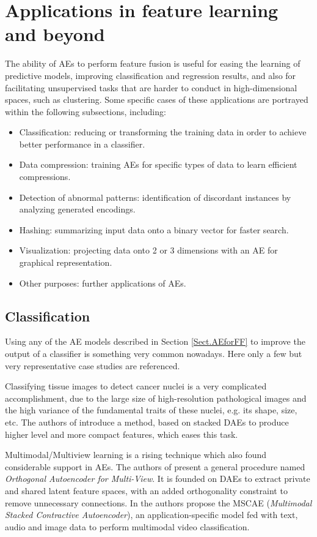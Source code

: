 \documentclass[preprint,5p,compress]{elsarticle}
\begin{document}
\section{Applications in feature learning and beyond}\label{Sec.Applications}

The ability of AEs to perform feature fusion is useful for easing the learning of predictive models, improving classification and regression results, and also for facilitating unsupervised tasks that are harder to conduct in high-dimensional spaces, such as clustering. Some specific cases of these applications are portrayed within the following subsections, including:
\begin{itemize}
  \setlength\itemsep{-.2em}
\item Classification: reducing or transforming the training data in order to achieve better performance in a classifier.
\item Data compression: training AEs for specific types of data to learn efficient compressions.
\item Detection of abnormal patterns: identification of discordant instances by analyzing generated encodings.
\item Hashing: summarizing input data onto a binary vector for faster search.
\item Visualization: projecting data onto 2 or 3 dimensions with an AE for graphical representation.
\item Other purposes: further applications of AEs.
\end{itemize}

\subsection{Classification}
Using any of the AE models described in Section \ref{Sect.AEforFF} to improve the output of a classifier is something very common nowadays. Here only a few but very representative case studies are referenced.

Classifying tissue images to detect cancer nuclei is a very complicated accomplishment, due to the large size of high-resolution pathological images and the high variance of the fundamental traits of these nuclei, e.g. its shape, size, etc. The authors of \cite{Xu2016} introduce a method, based on stacked DAEs to produce higher level and more compact features, which eases this task.

Multimodal/Multiview learning \cite{MultiviewLearning} is a rising technique which also found considerable support in AEs. The authors of \cite{tian_learning_2016} present a general procedure named \textit{Orthogonal Autoencoder for Multi-View}. It is founded on DAEs to extract private and shared latent feature spaces, with an added orthogonality constraint to remove unnecessary connections. In \cite{liu_multimodal_2016} the authors propose the MSCAE (\textit{Multimodal Stacked Contractive Autoencoder}), an application-specific model fed with text, audio and image data to perform multimodal video classification. 
\end{document}
